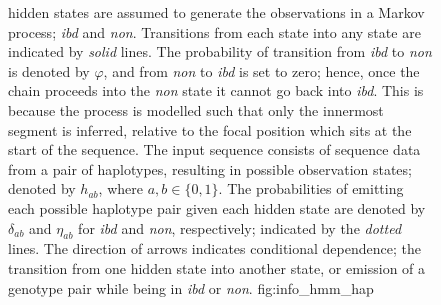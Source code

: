 \begin{figure}[!htb]
%
{ hidden states are assumed to generate the observations in a Markov process; \emph{ibd} and \emph{non}.
Transitions from each state into any state are indicated by \emph{solid} lines.
The probability of transition from \emph{ibd} to \emph{non} is denoted by $\varphi$, and from \emph{non} to \emph{ibd} is set to zero; hence, once the chain proceeds into the \emph{non} state it cannot go back into \emph{ibd}.
This is because the process is modelled such that only the innermost segment is inferred, relative to the focal position which sits at the start of the sequence.
The input sequence consists of sequence data from a pair of haplotypes, resulting in  possible observation states; denoted by $h_{ab}$, where ${a,b \in \lbrace 0,1 \rbrace}$.
The probabilities of emitting each possible haplotype pair given each hidden state are denoted by $\delta_{ab}$ and $\eta_{ab}$ for \emph{ibd} and \emph{non}, respectively; indicated by the \emph{dotted} lines.
The direction of arrows indicates conditional dependence; \ie the transition from one hidden state into another state, or emission of a genotype pair while being in \emph{ibd} or \emph{non}.}%
{fig:info_hmm_hap}
\end{figure}
